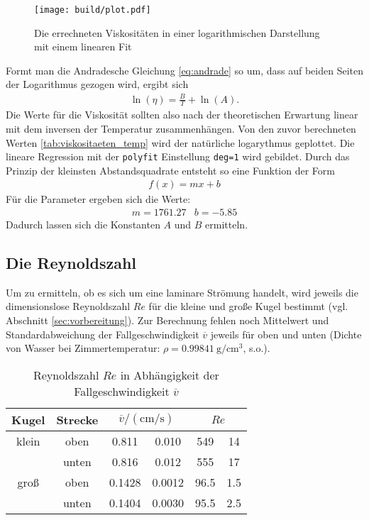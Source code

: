 \begin{figure}
    \centering
    \texttt{[image: build/plot.pdf]}
    \caption{Die errechneten Viskositäten in einer logarithmischen Darstellung mit einem linearen Fit}
    \label{fig:groKu_steigendeTemp_eta_fit}
\end{figure}
%
\noindent
Formt man die Andradesche Gleichung \eqref{eq:andrade} so um, dass auf beiden Seiten der Logarithmus gezogen wird, ergibt sich
\begin{align}
    \ln {\left( \eta \right)} = \frac{B}{T} + \ln{\left( A \right)}.
\end{align}
Die Werte für die Viskosität sollten also nach der theoretischen Erwartung linear mit dem inversen der Temperatur zusammenhängen.
Von den zuvor berechneten Werten \ref{tab:viskositaeten_temp} wird der natürliche logarythmus geplottet.
Die lineare Regression mit der \texttt{polyfit} Einstellung \texttt{deg=1} wird gebildet.
Durch das Prinzip der kleinsten Abstandsquadrate entsteht so eine Funktion der Form
\begin{align*}
    f(x) = mx + b
\end{align*}
Für die Parameter ergeben sich die Werte:
\begin{align*}
    m = 1761.27 & b = -5.85
\end{align*}
Dadurch lassen sich die Konstanten $A$ und $B$ ermitteln.


\subsection[]{Die Reynoldszahl}
Um zu ermitteln, ob es sich um eine laminare Strömung handelt, wird jeweils die dimensionslose Reynoldszahl $Re$ für die kleine und große Kugel bestimmt
(vgl. Abschnitt \ref{sec:vorbereitung}).
Zur Berechnung fehlen noch Mittelwert und Standardabweichung der Fallgeschwindigkeit $\overline{v}$ jeweils für oben und unten
(Dichte von Wasser bei Zimmertemperatur: $\rho = \qty{0.99841}{\g \per \cm^3}$, s.o.).

\begin{table}
    \caption[]{Reynoldszahl $Re$ in Abhängigkeit der Fallgeschwindigkeit $\overline{v}$}
    \label{tab:reynold}
    \centering
    \begin{tabular}[]{S S S[table-format=1.4] @{${}\pm{}$} S[table-format=1.4] S[table-format=4.1] @{${}\pm{}$} S[table-format=3.1]}
        \toprule
        {Kugel} & {Strecke} &  &  \\
        \bottomrule
        {klein} & {oben} & 0.811 & 0.010 & 549 & 14 \\
         & {unten} & 0.816 & 0.012 & 555 & 17 \\
        {groß} & {oben} & 0.1428 & 0.0012 & 96.5 & 1.5 \\
         & {unten} & 0.1404 & 0.0030 & 95.5 & 2.5 \\
    \end{tabular}
\end{table}

